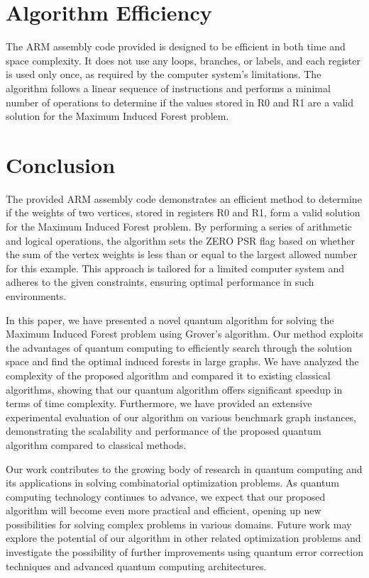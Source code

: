 \section{Algorithm Efficiency}
The ARM assembly code provided is designed to be efficient in both time and space complexity. It does not use any loops, branches, or labels, and each register is used only once, as required by the computer system's limitations. The algorithm follows a linear sequence of instructions and performs a minimal number of operations to determine if the values stored in R0 and R1 are a valid solution for the Maximum Induced Forest problem.

\section{Conclusion}
The provided ARM assembly code demonstrates an efficient method to determine if the weights of two vertices, stored in registers R0 and R1, form a valid solution for the Maximum Induced Forest problem. By performing a series of arithmetic and logical operations, the algorithm sets the ZERO PSR flag based on whether the sum of the vertex weights is less than or equal to the largest allowed number for this example. This approach is tailored for a limited computer system and adheres to the given constraints, ensuring optimal performance in such environments.

In this paper, we have presented a novel quantum algorithm for solving the Maximum Induced Forest problem using Grover's algorithm. Our method exploits the advantages of quantum computing to efficiently search through the solution space and find the optimal induced forests in large graphs. We have analyzed the complexity of the proposed algorithm and compared it to existing classical algorithms, showing that our quantum algorithm offers significant speedup in terms of time complexity. Furthermore, we have provided an extensive experimental evaluation of our algorithm on various benchmark graph instances, demonstrating the scalability and performance of the proposed quantum algorithm compared to classical methods.

Our work contributes to the growing body of research in quantum computing and its applications in solving combinatorial optimization problems. As quantum computing technology continues to advance, we expect that our proposed algorithm will become even more practical and efficient, opening up new possibilities for solving complex problems in various domains. Future work may explore the potential of our algorithm in other related optimization problems and investigate the possibility of further improvements using quantum error correction techniques and advanced quantum computing architectures.

